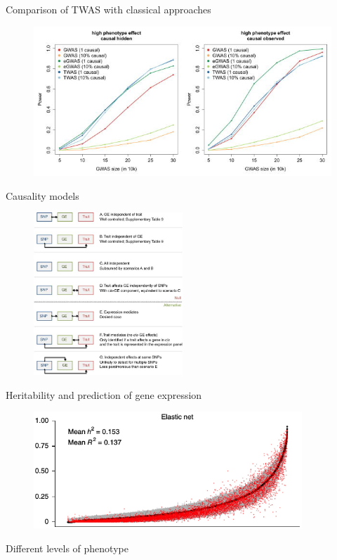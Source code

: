 \documentclass[aspectratio=169,12pt]{beamer}
\begin{document}
\begin{frame}{Comparison of TWAS with classical approaches}

	\begin{figure}
		\includegraphics{gusev2016/5-association_power}
	\end{figure}


\end{frame}

\begin{frame}{Causality models}

	\begin{figure}
		\includegraphics[width=0.5\textwidth]{gusev2016/2-causality_models}
	\end{figure}

\end{frame}

\begin{frame}{Heritability and prediction of gene expression}

	\begin{figure}
		\includegraphics[width=0.9\textwidth]{gamazon2015/3-prediction_r2}
	\end{figure}

\end{frame}

\begin{frame}{Different levels of phenotype}


\end{frame}
\end{document}
